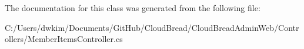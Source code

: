 The documentation for this class was generated from the following file\+:\begin{DoxyCompactItemize}
\item 
C\+:/\+Users/dwkim/\+Documents/\+Git\+Hub/\+Cloud\+Bread/\+Cloud\+Bread\+Admin\+Web/\+Controllers/Member\+Items\+Controller.\+cs\end{DoxyCompactItemize}
